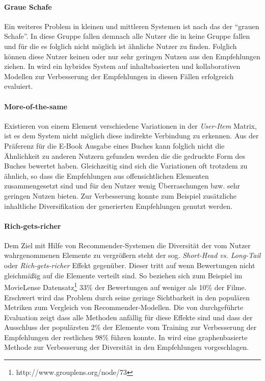 \paragraph{Graue Schafe} Ein weiteres Problem in kleinen und mittleren Systemen ist nach \citep{claypool99} das der ``grauen Schafe''. In diese Gruppe fallen demnach alle Nutzer die in keine Gruppe fallen und für die es folglich nicht möglich ist ähnliche Nutzer zu finden. Folglich können diese Nutzer keinen oder nur sehr geringen Nutzen aus den Empfehlungen ziehen. In \citep{claypool99} wird ein hybrides System auf inhaltsbasierten und kollaborativen Modellen zur Verbesserung der Empfehlungen in diesen Fällen erfolgreich evaluiert. \citep{Burke:2002:HRS:586321.586352}

\paragraph{More-of-the-same} Existieren von einem Element verschiedene Variationen in der \textit{User-Item} Matrix, ist es dem System nicht möglich diese indirekte Verbindung zu erkennen. Aus der Präferenz für die E-Book Ausgabe eines Buches kann folglich nicht die Ähnlichkeit zu anderen Nutzern gefunden werden die die gedruckte Form des Buches bewertet haben. Gleichzeitig sind sich die Variationen oft trotzdem zu ähnlich, so dass die Empfehlungen aus offensichtlichen Elementen zusammengesetzt sind und für den Nutzer wenig Überraschungen bzw. sehr geringen Nutzen bieten. Zur Verbesserung konnte zum Beispiel zusätzliche inhaltliche Diversifikation der generierten Empfehlungen genutzt werden. \citep[Kap. 3]{rs}

\paragraph{Rich-gets-richer}\label{sec:richgetsricher} Dem Ziel mit Hilfe von Recommender-Systemen die Diversität der vom Nutzer wahrgenommenen Elemente zu vergrößern steht der sog. \textit{Short-Head vs. Long-Tail} oder \textit{Rich-gets-richer} Effekt gegenüber. Dieser tritt auf wenn Bewertungen nicht gleichmäßig auf die Elemente verteilt sind. So beziehen sich zum Beispiel im MovieLense Datensatz\footnote{http://www.grouplens.org/node/73} 33\% der Bewertungen auf weniger als 10\% der Filme. Erschwert wird das Problem durch seine geringe Sichtbarkeit in den populären Metriken zum Vergleich von Recommender-Modellen. Die von \citep{Cremonesi:2010:PRA:1864708.1864721} durchgeführte Evaluation zeigt dass alle Methoden anfällig für diese Effekte sind und dass der Ausschluss der populärsten 2\% der Elemente vom Training zur Verbesserung der Empfehlungen der restlichen 98\% führen konnte. In \citep{Yin:2012:CLT:2311906.2311916} wird eine graphenbasierte Methode zur Verbesserung der Diversität in den Empfehlungen vorgeschlagen.

